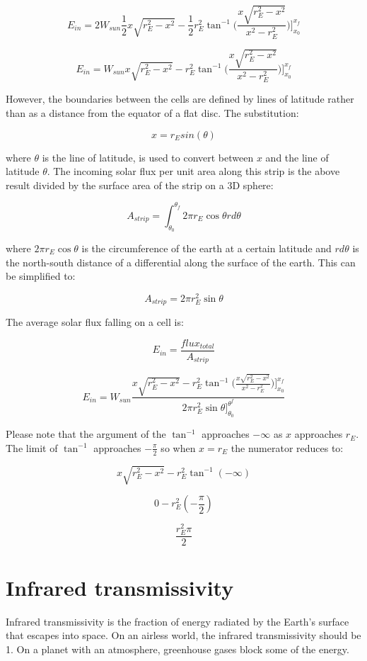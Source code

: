 \documentclass[12pt]{article} %
\begin{document}
$$E_{in} = 2 W_{sun} \frac{1}{2} x \sqrt{r_{E}^2 - x^2} - \frac{1}{2} r_{E}^2 \tan^{-1}\bigg({\frac{x \sqrt{r_{E}^2 - x^2}}{x^2 - r_{E}^2 }}\bigg)\bigg]_{x_0}^{x_f}$$

$$E_{in} = W_{sun} x \sqrt{r_{E}^2 - x^2} -  r_{E}^2 \tan^{-1}\bigg({\frac{x \sqrt{r_{E}^2 - x^2}}{x^2 - r_{E}^2 }}\bigg)\bigg]_{x_0}^{x_f}$$

However, the boundaries between the cells are defined by lines of latitude rather than as a distance from the equator of a flat disc. The substitution: 

$$x = r_{E} sin(\theta) $$

where $\theta$ is the line of latitude, is used to convert between $x$ and the line of latitude $\theta$. The incoming solar flux per
unit area along this strip is the above result divided by the surface area of the strip on a 3D sphere:

$$A_{strip} = \int_{\theta_{0}}^{\theta_{f}} 2 \pi r_{E} \cos{\theta} r d\theta $$

where $2 \pi r_{E} \cos{\theta}$ is the circumference of the earth at a certain latitude and $r d\theta$ is the north-south distance of a differential along the surface of the earth. This can be simplified to:

$$A_{strip} =  2 \pi r_{E}^2 \sin{\theta} $$

The average solar flux falling on a cell is:

$$E_{in} = \frac{flux_{total}}{A_{strip}}$$

$$\boxed{E_{in} = W_{sun}\frac{x \sqrt{r_{E}^2 - x^2} -  r_{E}^2 \tan^{-1}\bigg({\frac{x \sqrt{r_{E}^2 - x^2}}{x^2 - r_{E}^2 }}\bigg)\bigg]_{x_0}^{x_f}}{2 \pi r_{E}^2 \sin{\theta}]_{\theta_0}^{\theta^f}}}$$

Please note that the argument of the $\tan^{-1}$ approaches $-\infty$ as $x$ approaches $r_{E}$. The limit of $\tan^{-1}$ approaches $-\frac{\pi}{2}$ so when $x = r_{E}$ the numerator reduces to:

$$x \sqrt{r_{E}^2 - x^2} -  r_{E}^2 \tan^{-1}(-\infty)$$

$$0 -  r_{E}^2 (-\frac{\pi}{2})$$

$$\frac{r_{E}^2 \pi}{2}$$

\section{Infrared transmissivity}

Infrared transmissivity is the fraction of energy radiated by the Earth's surface that escapes into space. On an airless world, the infrared transmissivity should be 1. On a planet with an atmosphere, greenhouse gases block some of the energy.
\end{document}
